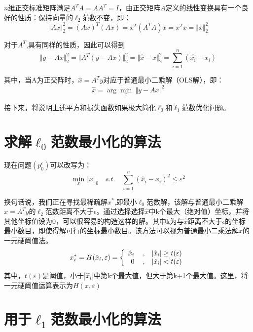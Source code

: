 $ n $维正交标准矩阵满足$ A^T A =AA^T=I$，由正交矩阵$ A $定义的线性变换具有一个良好的性质：保持向量的$ \ell_2 $范数不变，即：
$$  \Vert Ax \Vert_2^2 = (Ax)^T(Ax) =x^T(A^TA)x = x^Tx = \Vert x \Vert_2^2$$

对于$A^T$,具有同样的性质，因此可以得到
$$  \Vert y-Ax \Vert_2^2 = \Vert A^T( y-Ax) \Vert_2^2 = \Vert \hat{x}-x \Vert_2^2 = \sum_{i=1}^n (
\hat{x_i}-x_i)$$

其中，当A为正交阵时，$ \hat{x} = A^T y $对应于普通最小二乘解（OLS解），即：
\begin{equation}\label{key}
\hat{x} = \arg \min_x \: \Vert y-Ax\Vert^2
\end{equation}

接下来，将说明上述平方和损失函数如果极大简化$ \ell_0 $和$ \ell_1 $范数优化问题。


\section{求解$ \ell_0 $范数最小化的算法}
现在问题$ (p_{0}^{\epsilon}) $可以改写为：
\begin{equation}\label{key}
\min_{x}\Vert x\Vert_0\quad s.t. \quad  \sum_{i=1}^{n}(\hat{x}_i-x_i)^2\leq \varepsilon^2
\end{equation}

换句话说，我们正在寻找最稀疏解$ x^* $,即最小$ \ell_0 $范数解，该解与普通最小二乘解$ \hat{x}=A^Ty $的$ \ell_2 $范数距离不大于$ \epsilon $。通过选择选择$ \hat{x} $中k个最大（绝对值）坐标，并将其他坐标值设为0，可以很容易的构造这样的解。其中k为与$ \hat{x} $距离不大于$ \epsilon $的坐标最小数目，即使得解可行的坐标最小数目。该方法可以视为普通最小二乘法解$ \hat{x} $的一元硬阈值法。
\begin{equation}\label{key}
x_i^* = H(\hat{x}_i,\varepsilon) =
\left\{\begin{array}{r@{\:,\quad}l}
\hat{x}_i \quad &   |\hat{x}_i|\geq t(\varepsilon)\\
0         \quad &   |\hat{x}_i| <   t(\varepsilon)
\end{array} \right.
\end{equation}
其中，$ t(\varepsilon) $是阈值，小于$ {|\hat{x}_i|} $中第k个最大值，但大于第k+1个最大值。这里，将一元硬阈值运算表示为$ H(x,\varepsilon) $


\section{用于$ \ell_1 $范数最小化的算法}



